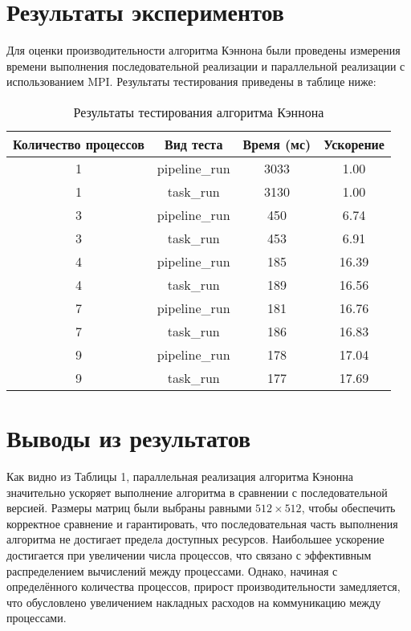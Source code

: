 \documentclass[12pt]{article}
\begin{document}
\section{Результаты экспериментов}

\hspace*{1.25em}Для оценки производительности алгоритма Кэннона были проведены измерения времени выполнения последовательной реализации и параллельной реализации с использованием MPI. Результаты тестирования приведены в таблице ниже:
\begin{table}[htbp]
\centering
\caption{Результаты тестирования алгоритма Кэннона}
\begin{tabular}{|c|c|c|c|}
    \hline
    \textbf{Количество процессов} & \textbf{Вид теста} & \textbf{Время (мс)} & \textbf{Ускорение} \\ \hline
    1 & pipeline\_run & 3033 & 1.00 \\ \hline
    1 & task\_run     & 3130 & 1.00 \\ \hline
    3 & pipeline\_run & 450  & 6.74 \\ \hline
    3 & task\_run     & 453  & 6.91 \\ \hline
    4 & pipeline\_run & 185  & 16.39 \\ \hline
    4 & task\_run     & 189  & 16.56 \\ \hline
    7 & pipeline\_run & 181  & 16.76 \\ \hline
    7 & task\_run     & 186  & 16.83 \\ \hline
    9 & pipeline\_run & 178  & 17.04 \\ \hline
    9 & task\_run     & 177  & 17.69 \\ \hline
\end{tabular}
\label{tab:performance_results}
\end{table}

\section{Выводы из результатов}

\hspace*{1.25em}Как видно из Таблицы 1, параллельная реализация алгоритма Кэнонна значительно ускоряет выполнение алгоритма в сравнении с последовательной версией. Размеры матриц были выбраны равными $512 \times 512$, чтобы обеспечить корректное сравнение и гарантировать, что последовательная часть выполнения алгоритма не достигает предела доступных ресурсов. Наибольшее ускорение достигается при увеличении числа процессов, что связано с эффективным распределением вычислений между процессами. Однако, начиная с определённого количества процессов, прирост производительности замедляется, что обусловлено увеличением накладных расходов на коммуникацию между процессами.
\end{document}
